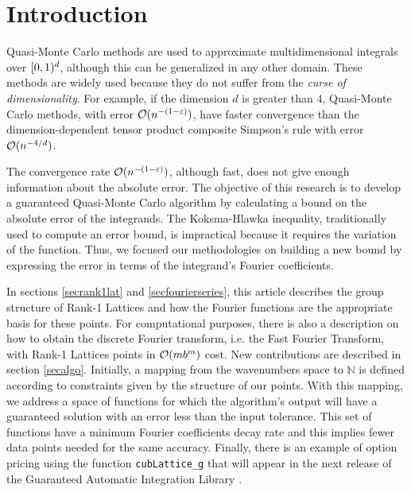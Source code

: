\documentclass[graybox]{svmult}
\newcommand{\N}{\mathbb{N}} %
\begin{document}

\section{Introduction}
Quasi-Monte Carlo methods are used to approximate multidimensional integrals over $[0,1)^d$, although this can be generalized in any other domain. These methods are widely used because they do not suffer from the \textit{curse of dimensionality}. For example, if the dimension $d$ is greater than $4$, Quasi-Monte Carlo methods, with error $\mathcal{O}(n^{-(1-\varepsilon)})$, have faster convergence than the dimension-dependent tensor product composite Simpson's rule with error $\mathcal{O}(n^{-4/d})$.

The convergence rate $\mathcal{O}(n^{-(1-\varepsilon)})$, although fast, does not give enough information about the absolute error. The objective of this research is to develop a guaranteed Quasi-Monte Carlo algorithm by calculating a bound on the absolute error of the integrands. The Koksma-Hlawka inequality, traditionally used to compute an error bound, is impractical because it requires the variation of the function. Thus, we focused our methodologies on building a new bound by expressing the error in terms of the integrand's Fourier coefficients. 

In sections \ref{secrank1lat} and \ref{secfourierseries}, this article describes the group structure of Rank-1 Lattices and how the Fourier functions are the appropriate basis for these points. For computational purposes, there is also a description on how to obtain the discrete Fourier transform, i.e. the Fast Fourier Transform, with Rank-1 Lattices points in $\mathcal{O}(mb^m)$ cost. New contributions are described in section \ref{secalgo}. Initially, a mapping from the wavenumbers space to $\N$ is defined according to constraints given by the structure of our points. With this mapping, we address a space of functions for which the algorithm's output will have a guaranteed solution with an error less than the input tolerance. This set of functions have a minimum Fourier coefficients decay rate and this implies fewer data points needed for the same accuracy. Finally, there is an example of option pricing using the function \texttt{cubLattice\_g} that will appear in the next release of the Guaranteed Automatic Integration Library \cite{ChoEtal14a}.
\end{document}
